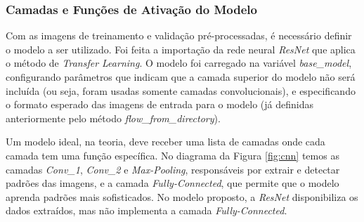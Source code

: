 

\subsubsection{\esp Camadas e Funções de Ativação do Modelo} \label{camadas}
Com as imagens de treinamento e validação pré-processadas, é necessário definir o modelo a ser utilizado. Foi feita a importação da rede neural \textit{ResNet} que aplica o método de \textit{Transfer Learning}. O modelo foi carregado na variável \textit{base\_model}, configurando parâmetros que indicam que a camada superior do modelo não será incluída (ou seja, foram usadas somente camadas convolucionais), e especificando o formato esperado das imagens de entrada para o modelo (já definidas anteriormente pelo método \textit{flow\_from\_directory}).

Um modelo ideal, na teoria, deve receber uma lista de camadas onde cada camada tem uma função específica. No diagrama da Figura \ref{fig:cnn} temos as camadas \textit{Conv\_1}, \textit{Conv\_2} e \textit{Max-Pooling}, responsáveis por extrair e detectar padrões das imagens, e a camada \textit{Fully-Connected}, que permite que o modelo aprenda padrões mais sofisticados. No modelo proposto, a \textit{ResNet} disponibiliza os dados extraídos, mas não implementa a camada \textit{Fully-Connected}.

